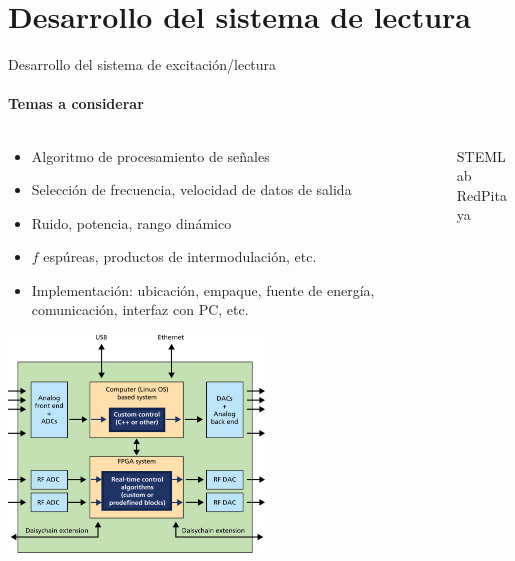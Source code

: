 \documentclass[ignorenonframetext,12pt]{beamer}
\begin{document}
\section{Desarrollo del sistema de lectura}
\begin{frame}{Desarrollo del sistema de excitación/lectura}
				\framesubtitle{Temas a considerar}
				\begin{columns}
								\begin{column}{0.5\textwidth}
												\footnotesize{\begin{itemize}
																\item Algoritmo de procesamiento de señales
																\item Selección de frecuencia, velocidad de datos de salida
																\item Ruido, potencia, rango dinámico
																\item $f$ espúreas, productos de intermodulación, etc.
																\item Implementación: ubicación, empaque, fuente de
																				energía, comunicación, interfaz con PC, etc.
												\end{itemize}}
												\begin{center}
																\includegraphics[width=0.6\textwidth]{rp_como_sistema}
												\end{center}
								\end{column}
								\begin{column}{0.5\textwidth}
												STEMLab RedPitaya

\end{column}
\end{columns}
\end{frame}
\end{document}
